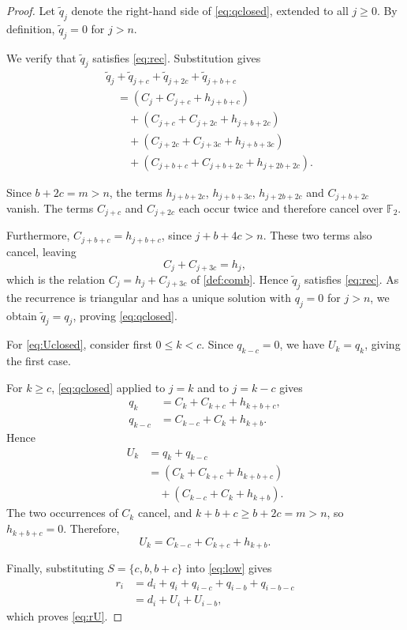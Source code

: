 \documentclass{ieeeaccess}
\theoremstyle{plain}
\theoremstyle{definition}
\newcommand{\F}{\mathbb{F}}
\begin{document}
\begin{proof}
Let $\tilde q_j$ denote the right-hand side of \eqref{eq:qclosed}, extended to
all $j\ge0$. By definition, $\tilde q_j=0$ for $j>n$.

We verify that $\tilde q_j$ satisfies \eqref{eq:rec}. Substitution gives
\begin{align*}
&\tilde q_j+\tilde q_{j+c}
 +\tilde q_{j+2c}+\tilde q_{j+b+c}\\
&\quad=
 (C_j+C_{j+c}+h_{j+b+c})\\
&\qquad+
 (C_{j+c}+C_{j+2c}+h_{j+b+2c})\\
&\qquad+
 (C_{j+2c}+C_{j+3c}+h_{j+b+3c})\\
&\qquad+
 (C_{j+b+c}+C_{j+b+2c}
  +h_{j+2b+2c}).
\end{align*}

Since $b+2c=m>n$, the terms $h_{j+b+2c}$, $h_{j+b+3c}$, $h_{j+2b+2c}$ and
$C_{j+b+2c}$ vanish. The terms $C_{j+c}$ and $C_{j+2c}$ each occur twice and
therefore cancel over $\F_2$.

Furthermore, $C_{j+b+c}=h_{j+b+c}$, since $j+b+4c>n$. These two terms also
cancel, leaving
\[
  C_j+C_{j+3c}=h_j,
\]
which is the relation $C_j=h_j+C_{j+3c}$ of \cref{def:comb}.
Hence $\tilde q_j$ satisfies \eqref{eq:rec}. As the recurrence is triangular and
has a unique solution with $q_j=0$ for $j>n$, we obtain $\tilde q_j=q_j$,
proving \eqref{eq:qclosed}.

For \eqref{eq:Uclosed}, consider first $0\le k<c$. Since $q_{k-c}=0$, we have
$U_k=q_k$, giving the first case.

For $k\ge c$, \eqref{eq:qclosed} applied to $j=k$ and to $j=k-c$ gives
\begin{align*}
 q_k&=C_k+C_{k+c}+h_{k+b+c},\\
 q_{k-c}&=C_{k-c}+C_k+h_{k+b}.
\end{align*}
Hence
\begin{align*}
 U_k
 &=q_k+q_{k-c}\\
 &=(C_k+C_{k+c}+h_{k+b+c})\\
 &\quad +(C_{k-c}+C_k+h_{k+b}).
\end{align*}
The two occurrences of $C_k$ cancel, and $k+b+c\ge b+2c=m>n$, so
$h_{k+b+c}=0$. Therefore,
\[
  U_k=C_{k-c}+C_{k+c}+h_{k+b}.
\]

Finally, substituting $S=\{c,b,b+c\}$ into \eqref{eq:low} gives
\begin{align*}
 r_i
 &=d_i+q_i+q_{i-c}+q_{i-b}
   +q_{i-b-c}\\
 &=d_i+U_i+U_{i-b},
\end{align*}
which proves \eqref{eq:rU}.
\end{proof}
\end{document}
